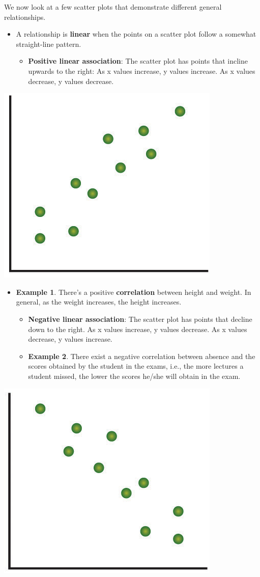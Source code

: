 \documentclass[
]{book}
\providecommand{\tightlist}{%
  \setlength{\itemsep}{0pt}\setlength{\parskip}{0pt}}
\begin{document}
We now look at a few scatter plots that demonstrate different general relationships.

\begin{itemize}
\item
  A relationship is \textbf{linear} when the points on a scatter plot follow a somewhat straight-line pattern.

  \begin{itemize}
  \tightlist
  \item
    \textbf{Positive linear association}: The scatter plot has points that incline upwards to the right: As x values increase, y values increase. As x values decrease, y values decrease. \\
  \end{itemize}
\end{itemize}

\begin{center}\includegraphics[width=0.25\linewidth]{week12/linearPos} \end{center}

\begin{itemize}
\tightlist
\item
  \textbf{Example 1}. There's a positive \textbf{correlation} between height and weight. In general, as the weight increases, the height increases.
  ~

  \begin{itemize}
  \tightlist
  \item
    \textbf{Negative linear association}: The scatter plot has points that decline down to the right. As x values increase, y values decrease. As x values decrease, y values increase.\\
  \item
    \textbf{Example 2}. There exist a negative correlation between absence and the scores obtained by the student in the exams, i.e., the more lectures a student missed, the lower the scores he/she will obtain in the exam.
  \end{itemize}
\end{itemize}

\begin{center}\includegraphics[width=0.25\linewidth]{week12/linearNeg} \end{center}
\end{document}
